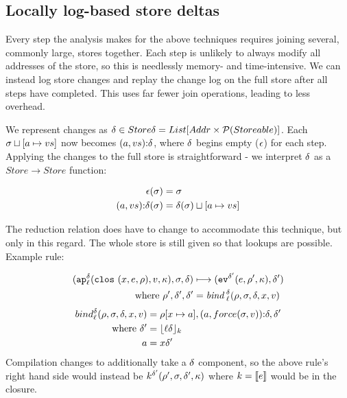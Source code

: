 \documentclass[preprint,onecolumn,9pt]{sigplanconf} %
\begin{document}



\subsection{Locally log-based store deltas}

Every step the analysis makes for the above techniques requires
joining several, commonly large, stores together. Each step is
unlikely to always modify all addresses of the store, so this is
needlessly memory- and time-intensive. We can instead log store
changes and replay the change log on the full store after all steps
have completed. This uses far fewer join operations, leading to less
overhead.

We represent changes as $\msdiff \in Store\msdiff = List[Addr \times
  \Set(Storeable)]$. Each $\msto\sqcup[\maddr \mapsto \mval{s}]$ now
becomes $\cons{\ttuple{\maddr}{\mval{s}}}{\msdiff}$, where $\msdiff$
begins empty ($\mtlst$) for each step. Applying the changes to the
full store is straightforward - we interpret $\msdiff$ as a $Store \to
Store$ function:

\begin{align*}
\mtlst(\msto) &= \msto \\
\cons{\ttuple{\maddr}{\mval{s}}}{\msdiff}(\msto) &= \msdiff(\msto)\sqcup[\maddr \mapsto \mval{s}]
\end{align*}

The reduction relation does have to change to accommodate this
technique, but only in this regard. The whole store is still given so
that lookups are possible. Example rule:

\begin{align*}
(\ap[^\mcntr_\mlab]{\clos{\mvar,\mexp,\menv},\mval,\mkont},\msto,\msdiff) & \machstep
(\ev[^{\mcntr'}]{\mexp,\menv',\mkont},\msdiff') \\
\text{ where }\menv',\msdiff',\mcntr' &= \mathit{bind\,}^{ \mcntr}_\mlab(\menv,\msto,\msdiff,\mvar,\mval)
\end{align*}
\begin{align*}
bind^{\mcntr}_\mlab(\menv, \msto, \msdiff, \mvar, \mval) &= \menv[\mvar \mapsto \maddr], \cons{\ttuple{\maddr}{force(\msto,\mval)}}{\msdiff}, \mcntr' \\
\text{ where } \mcntr' &= \lfloor \mlab \mcntr\rfloor_k \\
               \maddr &= \mvar\mcntr'
\end{align*}
Compilation changes to additionally take a $\msdiff$ component, so the
above rule's right hand side would instead be $k^{\mcntr'}(\menv',
\msto, \msdiff', \mkont)$ where $k = \compile{e}$ would be in the closure.
\end{document}

